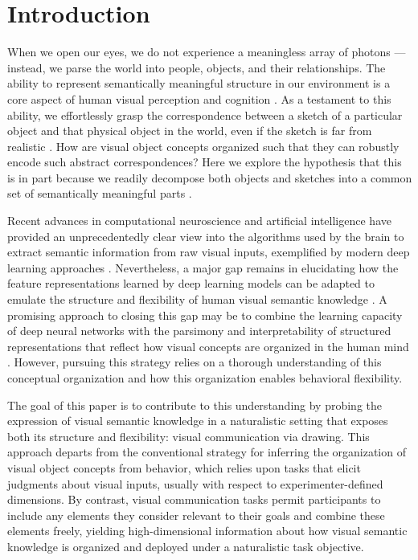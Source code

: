 \documentclass[10pt,letterpaper]{article}
\begin{document}
\section{Introduction}


When we open our eyes, we do not experience a meaningless array of photons --- instead, we parse the world into people, objects, and their relationships. 
The ability to represent semantically meaningful structure in our environment is a core aspect of human visual perception and cognition \cite{navon1977forest}. 
As a testament to this ability, we effortlessly grasp the correspondence between a sketch of a particular object and that physical object in the world, even if the sketch is far from realistic \cite{eitz2012humans,FanCommon2018}. 
How are visual object concepts organized such that they can robustly encode such abstract correspondences?
Here we explore the hypothesis that this is in part because we readily decompose both objects and sketches into a common set of semantically meaningful parts \cite{biederman1988surface}. 

Recent advances in computational neuroscience and artificial intelligence have provided an unprecedentedly clear view into the algorithms used by the brain to extract semantic information from raw visual inputs, exemplified by modern deep learning approaches \cite{yamins2014performance}.
Nevertheless, a major gap remains in elucidating how the feature representations learned by deep learning models can be adapted to emulate the structure and flexibility of human visual semantic knowledge \cite{lake2017building}.
A promising approach to closing this gap may be to combine the learning capacity of deep neural networks with the parsimony and interpretability of structured representations that reflect how visual concepts are organized in the human mind \cite{battaglia2018relational}. 
However, pursuing this strategy relies on a thorough understanding of this conceptual organization and how this organization enables behavioral flexibility.  

The goal of this paper is to contribute to this understanding by probing the expression of visual semantic knowledge in a naturalistic setting that exposes both its structure and flexibility: visual communication via drawing. 
This approach departs from the conventional strategy for inferring the organization of visual object concepts from behavior, which relies upon tasks that elicit judgments about visual inputs, usually with respect to experimenter-defined dimensions. 
By contrast, visual communication tasks permit participants to include any elements they consider relevant to their goals and combine these elements freely, yielding high-dimensional information about how visual semantic knowledge is organized and deployed under a naturalistic task objective. 
\end{document}
